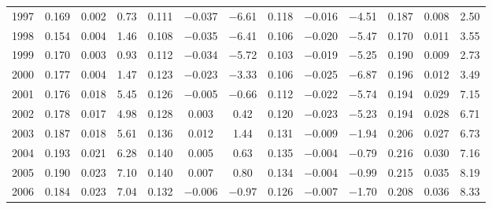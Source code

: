{\begin{tabular}{l*{4}{ccc}}
1997        &       0.169&       0.002&        0.73&       0.111&    $-$0.037&     $-$6.61&       0.118&    $-$0.016&     $-$4.51&       0.187&       0.008&        2.50\\
1998        &       0.154&       0.004&        1.46&       0.108&    $-$0.035&     $-$6.41&       0.106&    $-$0.020&     $-$5.47&       0.170&       0.011&        3.55\\
1999        &       0.170&       0.003&        0.93&       0.112&    $-$0.034&     $-$5.72&       0.103&    $-$0.019&     $-$5.25&       0.190&       0.009&        2.73\\
2000        &       0.177&       0.004&        1.47&       0.123&    $-$0.023&     $-$3.33&       0.106&    $-$0.025&     $-$6.87&       0.196&       0.012&        3.49\\
2001        &       0.176&       0.018&        5.45&       0.126&    $-$0.005&     $-$0.66&       0.112&    $-$0.022&     $-$5.74&       0.194&       0.029&        7.15\\
2002        &       0.178&       0.017&        4.98&       0.128&       0.003&        0.42&       0.120&    $-$0.023&     $-$5.23&       0.194&       0.028&        6.71\\
2003        &       0.187&       0.018&        5.61&       0.136&       0.012&        1.44&       0.131&    $-$0.009&     $-$1.94&       0.206&       0.027&        6.73\\
2004        &       0.193&       0.021&        6.28&       0.140&       0.005&        0.63&       0.135&    $-$0.004&     $-$0.79&       0.216&       0.030&        7.16\\
2005        &       0.190&       0.023&        7.10&       0.140&       0.007&        0.80&       0.134&    $-$0.004&     $-$0.99&       0.215&       0.035&        8.19\\
2006        &       0.184&       0.023&        7.04&       0.132&    $-$0.006&     $-$0.97&       0.126&    $-$0.007&     $-$1.70&       0.208&       0.036&        8.33\\
\bottomrule
\end{tabular}
}
